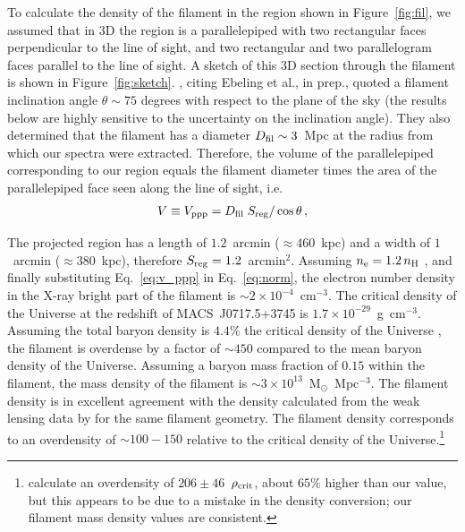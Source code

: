 To calculate the density of the filament in the region shown in Figure~\ref{fig:fil}, we assumed that in 3D the region is a parallelepiped with two rectangular faces perpendicular to the line of sight, and two rectangular and two parallelogram faces parallel to the line of sight. A sketch of this 3D section through the filament is shown in Figure~\ref{fig:sketch}. \citet{Jauzac2012}, citing Ebeling et al., in prep., quoted a filament inclination angle $\theta \sim 75$ degrees with respect to the plane of the sky (the results below are highly sensitive to the uncertainty on the inclination angle). They also determined that the filament has a diameter $D_{\rm fil} \sim 3$~Mpc at the radius from which our spectra were extracted. Therefore, the volume of the parallelepiped corresponding to our region equals the filament diameter times the area of the parallelepiped face seen along the line of sight, i.e.
\begin{eqnarray}
    V \equiv V_{\rm ppp} = D_{\rm fil} \; S_{\rm reg} / \cos\theta\,  , 
\label{eq:v_ppp}
\end{eqnarray}

The projected region has a length of $1.2$~arcmin ($\approx 460$~kpc) and a width of $1$~arcmin ($\approx 380$~kpc), therefore $S_{\rm reg} = 1.2$~arcmin$^{2}$. Assuming $n_{\rm e} = 1.2\, n_{\rm H}$ \citep[e.g.,][]{Bohringer2010}, and finally substituting Eq.~\ref{eq:v_ppp} in Eq.~\ref{eq:norm}, the electron number density in the X-ray bright part of the filament is $\sim 2\times 10^{-4}$~cm$^{-3}$. The critical density of the Universe at the redshift of MACS~J0717.5+3745 is $1.7\times 10^{-29}$~g~cm$^{-3}$. Assuming the total baryon density is $4.4\%$ the critical density of the Universe \citep{Kirkman2003}, the filament is overdense by a factor of $\sim 450$ compared to the mean baryon density of the Universe. Assuming a baryon mass fraction of $0.15$ \citep[e.g.,][]{Mantz2014} within the filament, the mass density of the filament is $\sim 3\times 10^{13}$~M$_{\odot}$~Mpc$^{-3}$. The filament density is in excellent agreement with the density calculated from the weak lensing data by \citet{Jauzac2012} for the same filament geometry. The filament density corresponds to an overdensity of $\sim 100-150$ relative to the critical density of the Universe.\footnote{\citet{Jauzac2012} calculate an overdensity of $206\pm 46$~$\rho_{\rm crit}$, about $65\%$ higher than our value, but this appears to be due to a mistake in the density conversion; our filament mass density values are consistent.} 

